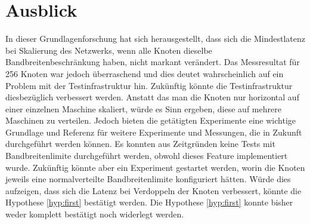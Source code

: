 \chapter{Ausblick}\label{ch:Ausblick}

In dieser Grundlagenforschung hat sich herausgestellt,
dass sich die Mindestlatenz bei Skalierung des Netzwerks,
wenn alle Knoten dieselbe Bandbreitenbeschränkung haben,
nicht markant verändert.
Das Messresultat für 256 Knoten war jedoch überraschend und dies deutet wahrscheinlich auf ein Problem mit der Testinfrastruktur hin.
Zukünftig könnte die Testinfrastruktur diesbezüglich verbessert werden.
Anstatt das man die Knoten nur horizontal auf einer einzelnen Maschine skaliert, würde es Sinn ergeben, diese auf mehrere Maschinen zu verteilen.
Jedoch bieten die getätigten Experimente eine wichtige Grundlage und Referenz für weitere Experimente und Messungen, die in Zukunft durchgeführt werden können.
Es konnten aus Zeitgründen keine Tests mit Bandbreitenlimite durchgeführt werden, obwohl dieses Feature implementiert wurde.
Zukünftig könnte aber ein Experiment gestartet werden, worin die Knoten jeweils eine normalverteilte Bandbreitenlimite konfiguriert hätten. 
Würde dies aufzeigen, dass sich die Latenz bei Verdoppeln der Knoten verbessert, könnte die Hypothese \ref{hyp:first} bestätigt werden.
Die Hypothese \ref{hyp:first} konnte bisher weder komplett bestätigt noch widerlegt werden.

